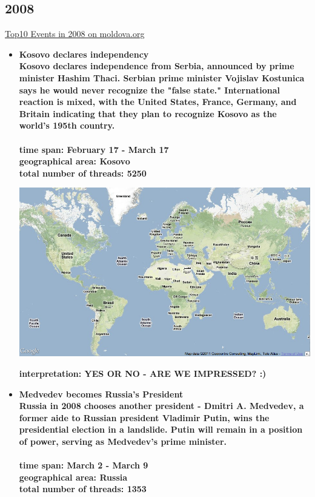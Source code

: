 \documentclass[11pt,a4paper,english]{article}
\begin{document}
			\subsection{2008}
			\href{http://social.moldova.org/news/10-most-important-world-events-of-2008-217389-eng.html}{Top10 Events in 2008 on moldova.org}
				\begin{itemize}
					\item \bf Kosovo declares independency \rm
						\\ Kosovo declares independence from Serbia, announced by prime minister Hashim Thaci. Serbian prime minister Vojislav Kostunica says he would never recognize the "false state." International reaction is mixed, with the United States, France, Germany, and Britain indicating that they plan to recognize Kosovo as the world's 195th country.
						\\\\ \bf time span: \rm February 17 - March 17
						\\ \bf geographical area: \rm Kosovo
						\\ \bf total number of threads: \rm 5250
					
						\includegraphics[width=130mm]{img/2005-1}
						
						\bf interpretation: \rm YES OR NO - ARE WE IMPRESSED? :)
						
						
						
					\item \bf Medvedev becomes Russia's President \rm
						\\ Russia in 2008 chooses another president - Dmitri A. Medvedev, a former aide to Russian president Vladimir Putin, wins the presidential election in a landslide. Putin will remain in a position of power, serving as Medvedev's prime minister.
						\\\\ \bf time span: \rm March 2 - March 9
						\\ \bf geographical area: \rm Russia
						\\ \bf total number of threads: \rm 1353
						

\end{itemize}
\end{document}
